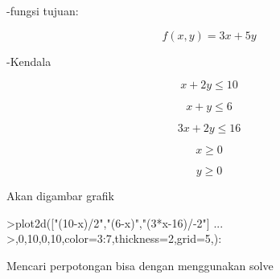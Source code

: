 \documentclass{article}
\begin{document}
\begin{eulernotebook}
\begin{eulercomment}
\begin{eulercomment}
\begin{eulercomment}
\begin{eulercomment}
\begin{eulercomment}
\begin{eulercomment}
\begin{eulercomment}
-fungsi tujuan:\\
\end{eulercomment}
\begin{eulerformula}
\[
f(x,y)=3x+5y
\]
\end{eulerformula}
\begin{eulercomment}
-Kendala\\
\end{eulercomment}
\begin{eulerformula}
\[
x+2y\le10
\]
\end{eulerformula}
\begin{eulerformula}
\[
x+y\le 6
\]
\end{eulerformula}
\begin{eulerformula}
\[
3x+2y\le16
\]
\end{eulerformula}
\begin{eulerformula}
\[
x\ge 0
\]
\end{eulerformula}
\begin{eulerformula}
\[
y\ge 0
\]
\end{eulerformula}
\begin{eulercomment}
Akan digambar grafik
\end{eulercomment}
\begin{eulerprompt}
>plot2d(["(10-x)/2","(6-x)","(3*x-16)/-2"] ...
>,0,10,0,10,color=3:7,thickness=2,grid=5,):
\end{eulerprompt}
\begin{eulercomment}
Mencari perpotongan bisa dengan menggunakan solve


\end{eulercomment}
\end{eulercomment}
\end{eulercomment}
\end{eulercomment}
\end{eulercomment}
\end{eulercomment}
\end{eulercomment}
\end{eulernotebook}
\end{document}
